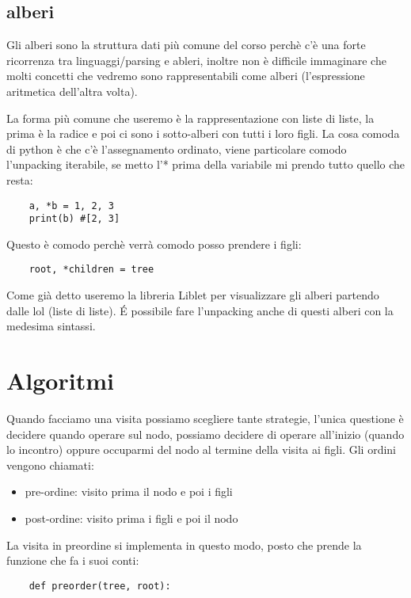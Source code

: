 \subsection{alberi}
Gli alberi sono la struttura dati più comune del corso perchè c'è una forte ricorrenza tra linguaggi/parsing e ableri, inoltre non è difficile immaginare che molti concetti che vedremo sono rappresentabili come alberi (l'espressione aritmetica dell'altra volta).

La forma più comune che useremo è la rappresentazione con liste di liste, la prima è la radice e poi ci sono i sotto-alberi con tutti i loro figli.
La cosa comoda di python è che c'è l'assegnamento ordinato, viene particolare comodo l'unpacking iterabile, se metto l'* prima della variabile mi prendo tutto quello che resta:
\begin{lstlisting}
    a, *b = 1, 2, 3
    print(b) #[2, 3]
\end{lstlisting}

Questo è comodo perchè verrà comodo posso prendere i figli:
\begin{lstlisting}
    root, *children = tree
\end{lstlisting}

Come già detto useremo la libreria Liblet per visualizzare gli alberi partendo dalle lol (liste di liste).
\'E possibile fare l'unpacking anche di questi alberi con la medesima sintassi.

\section{Algoritmi}
Quando facciamo una visita possiamo scegliere tante strategie, l'unica questione è decidere quando operare sul nodo, possiamo decidere di operare all'inizio (quando lo incontro) oppure occuparmi del nodo al termine della visita ai figli. Gli ordini vengono chiamati:
\begin{itemize}
    \item pre-ordine: visito prima il nodo e poi i figli
    \item post-ordine: visito prima i figli e poi il nodo
\end{itemize}

La visita in preordine si implementa in questo modo, posto che prende la funzione che fa i suoi conti:
\begin{lstlisting}
    def preorder(tree, root):

\end{lstlisting}

